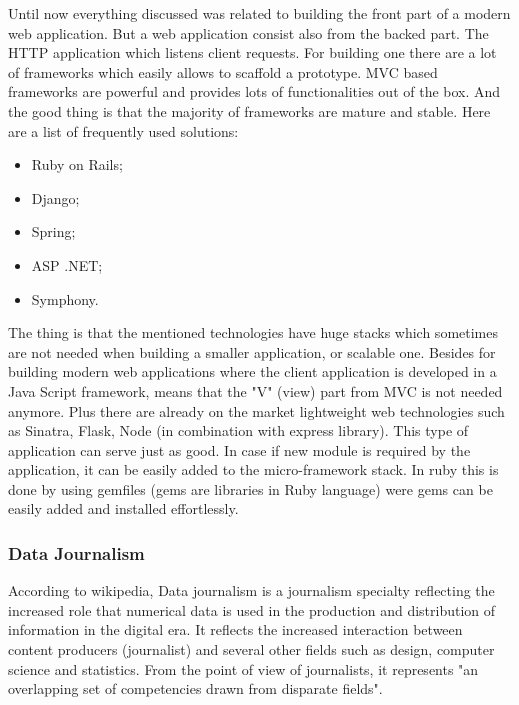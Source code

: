 Until now everything discussed was related to building the front part of a modern web application. But a web application consist also from the backed part. The HTTP application which listens client requests. For building one there are a lot of frameworks which easily allows to scaffold a prototype. MVC based frameworks are powerful and provides lots of functionalities out of the box. And the good thing is that the majority of frameworks are mature and stable. Here are a list of frequently used solutions:
\begin{itemize}
    \item Ruby on Rails;
    \item Django;
    \item Spring;
    \item ASP .NET;
    \item Symphony.
\end{itemize}
The thing is that the mentioned technologies have huge stacks which sometimes are not needed when building a smaller application, or scalable one. Besides for building modern web applications where the client application is developed in a Java Script framework, means that the "V" (view) part from MVC is not needed anymore. Plus there are already on the market lightweight web technologies such as Sinatra, Flask, Node (in combination with express library). This type of application can serve just as good. In case if new module is required by the application, it can be easily added to the micro-framework stack. In ruby this is done by using gemfiles (gems are libraries in Ruby language) were gems can be easily added and installed effortlessly.

\subsubsection{Data Journalism}
According to wikipedia, Data journalism is a journalism specialty reflecting the increased role that numerical data is used in the production and distribution of information in the digital era. It reflects the increased interaction between content producers (journalist) and several other fields such as design, computer science and statistics. From the point of view of journalists, it represents "an overlapping set of competencies drawn from disparate fields". \cite{wiki_data_journalism}

